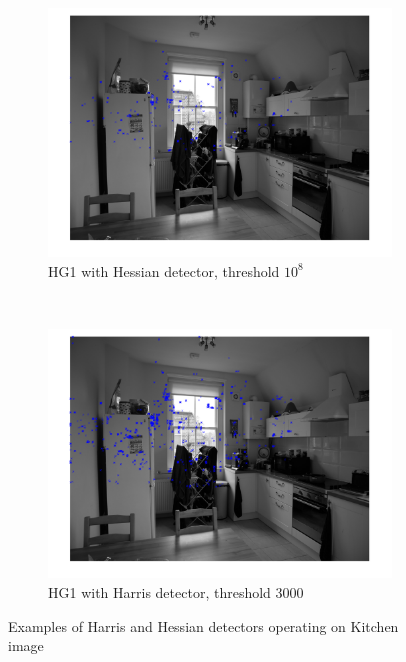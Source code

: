 \documentclass[a4paper, 10pt, conference]{ieeeconf}
\begin{document}
\begin{figure}[!ht]
  \captionsetup[subfigure]{position=b}
  \centering
    \begin{subfigure}{0.45\linewidth}
      \includegraphics[width=\textwidth]{pic/hessian1e8}
      \caption{HG1 with Hessian detector, threshold $10^8$}
      \label{fig:hessian1e8}
    \end{subfigure}
    ~
    \begin{subfigure}{0.45\linewidth}
      \includegraphics[width=\textwidth]{pic/harris3000}
      \caption{HG1 with Harris detector, threshold 3000}
      \label{fig:harris3000}
    \end{subfigure}

	\caption{Examples of Harris and Hessian detectors operating on Kitchen image}
    \vspace{-0.5cm}

  \label{fig:detectors}
\end{figure}
\end{document}
